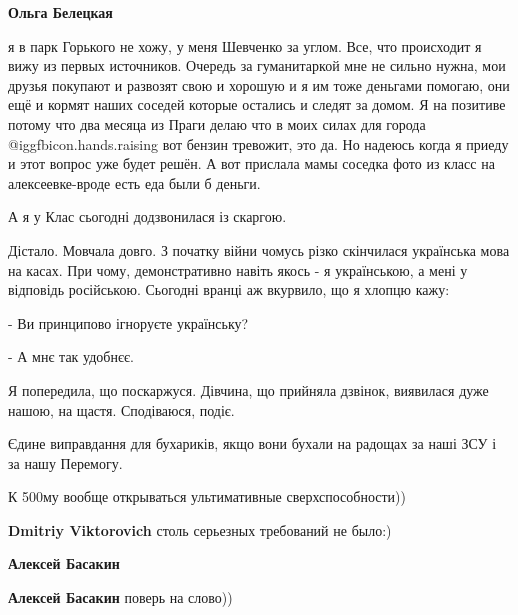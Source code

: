 \begin{itemize}
\begin{itemize}
\textbf{Ольга Белецкая} 

я в парк Горького не хожу, у меня Шевченко за углом. Все, что происходит я вижу
из первых источников. Очередь за гуманитаркой мне не сильно нужна, мои друзья
покупают и развозят свою и хорошую и я им тоже деньгами помогаю, они ещё и
кормят наших соседей которые остались и следят за домом. Я на позитиве потому
что два месяца из Праги делаю что в моих силах для города @igg{fbicon.hands.raising}  вот бензин
тревожит, это да. Но надеюсь когда я приеду и этот вопрос уже будет решён. А
вот прислала мамы соседка фото из класс на алексеевке-вроде есть еда были б
деньги.

\end{itemize} %


А я у Клас сьогодні додзвонилася із скаргою.

Дістало. Мовчала довго. З початку війни чомусь різко скінчилася українська мова
на касах. При чому, демонстративно навіть якось - я українською, а мені у
відповідь російською. Сьогодні вранці аж вкурвило, що я хлопцю кажу:

- Ви принципово ігноруєте українську?

- А мнє так удобнєє.

Я попередила, що поскаржуся. Дівчина, що прийняла дзвінок, виявилася дуже
нашою, на щастя. Сподіваюся, подіє.


Єдине виправдання для бухариків, якщо вони бухали на радощах за наші ЗСУ і за
нашу Перемогу.


К 500му вообще открываться ультимативные сверхспособности))

\begin{itemize} %
\textbf{Dmitriy Viktorovich} столь серьезных требований не было:)

\textbf{Алексей Басакин}

\textbf{Алексей Басакин} поверь на слово))
\end{itemize} %

\end{itemize} %
